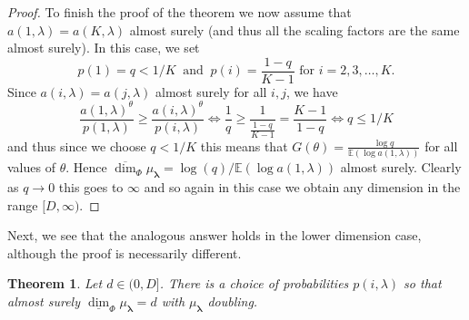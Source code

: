 \documentclass{amsart}
\newtheorem{theorem}{Theorem}
\theoremstyle{plain}
\numberwithin{equation}{section}
\newcommand{\blambda}{{\boldsymbol{\lambda}}}
\newcommand{\ee}{{\mathbb E}}
\newcommand{\udim}{\underline{\dim}}
\begin{document}
\begin{proof}
To finish the proof of the theorem we now assume that $a(1,\lambda)=a(K,\lambda)$ almost surely 
(and thus all the scaling factors are the same almost surely). 
In this case, we set 
\begin{equation*}
          p(1)=q<1/K\ \text{ and }\ p(i)=\frac{1-q}{K-1}\text{ for }i=2,3,\ldots ,K.
\end{equation*}%
Since $a(i,\lambda)=a(j,\lambda)$ almost surely for all $i,j$, we have 
\begin{equation*}
        \frac{a(1,\lambda)^\theta}{p(1,\lambda)}\geq \frac{a(i,\lambda)^\theta}{p(i,\lambda)}\Leftrightarrow 
             \frac{1}{q}\geq \frac{1}{\frac{1-q}{K-1}}=\frac{K-1}{1-q}\Leftrightarrow q\leq 1/K
\end{equation*}
and thus since we choose $q < 1/K$ this means that $G(\theta)=\frac{\log q}{\ee(\log a(1,\lambda))}$ for all values of $\theta $. 
Hence $\overline{\dim}_{\Phi}\mu_\blambda=\log (q)/\ee(\log a(1,\lambda))$ almost surely. 
Clearly as $q\rightarrow 0$ this goes to $\infty $ and so again in this case we obtain any dimension in the range $[D,\infty)$.
\end{proof}

Next, we see that the analogous answer holds in the lower dimension case,
although the proof is necessarily different.

\begin{theorem} \label{thm:lower_dependent}
Let $d \in (0,D]$. 
There is a choice of probabilities $p(i,\lambda)$ so that almost surely $\udim_\Phi \mu_\blambda = d$ with $\mu_\blambda$ doubling.
\end{theorem}
\end{document}
